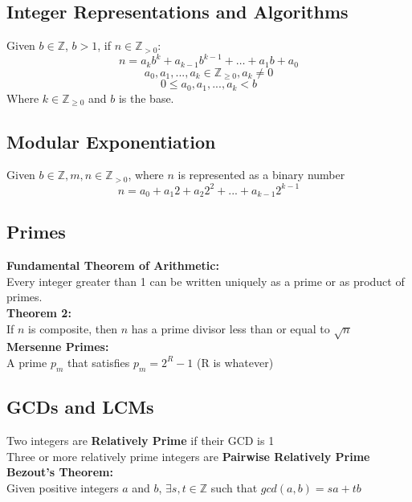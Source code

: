 \documentclass[letter]{article}
\begin{document}
\begin{multicols}{2}
  \subsection{Integer Representations and Algorithms}\noindent
  Given $b \in \mathbb{Z}$, $b > 1$, if $n \in \mathbb{Z}_{>0}$: $$n = a_kb^k +
  a_{k-1}b^{k-1} + \ldots + a_1b + a_0$$
  $$ a_0, a_1, ..., a_k \in \mathbb{Z}_{\geq 0}, a_k \neq 0$$
  $$0 \leq a_0, a_1, ..., a_k < b$$
   Where $k \in \mathbb{Z}_{\geq 0}$ and $b$ is the base.

  \subsection{Modular Exponentiation}\noindent
  Given $b \in \mathbb{Z}, m, n \in \mathbb{Z}_{>0}$, where $n$ is represented as a binary number
  $$ n = a_0 + a_1 2 + a_2 2^2 + ... + a_{k-1}2^{k-1}$$

  \subsection{Primes}\noindent
  \textbf{Fundamental Theorem of Arithmetic:}\\
  Every integer greater than 1 can be written uniquely as a prime or as product of primes.\\
  \textbf{Theorem 2:}\\
  If $n$ is composite, then $n$ has a prime divisor less than or equal to $\sqrt n$\\
  \textbf{Mersenne Primes:}\\ A prime $p_m$ that satisfies $p_m = 2^R - 1$ (R is whatever)\\

  \subsection{GCDs and LCMs}\noindent
  Two integers are \textbf{Relatively Prime} if their GCD is 1\\
  Three or more relatively prime integers are \textbf{Pairwise Relatively Prime}\\
  \textbf{Bezout's Theorem:}\\ Given positive integers $a$ and $b$, $\exists s,t\in \mathbb{Z}$
  such that $gcd(a,b) = sa + tb$


\end{multicols}
\end{document}
